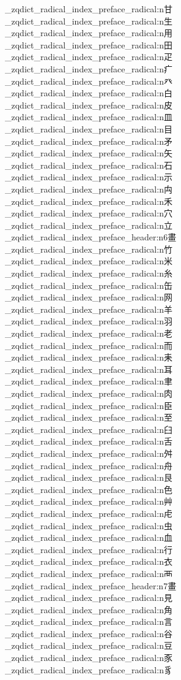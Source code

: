 {\begin{multicols}{5}
  \_zqdict_radical_index_preface_radical:n{甘}
  \_zqdict_radical_index_preface_radical:n{生}
  \_zqdict_radical_index_preface_radical:n{用}
  \_zqdict_radical_index_preface_radical:n{田}
  \_zqdict_radical_index_preface_radical:n{疋}
  \_zqdict_radical_index_preface_radical:n{疒}
  \_zqdict_radical_index_preface_radical:n{癶}
  \_zqdict_radical_index_preface_radical:n{白}
  \_zqdict_radical_index_preface_radical:n{皮}
  \_zqdict_radical_index_preface_radical:n{皿}
  \_zqdict_radical_index_preface_radical:n{目}
  \_zqdict_radical_index_preface_radical:n{矛}
  \_zqdict_radical_index_preface_radical:n{矢}
  \_zqdict_radical_index_preface_radical:n{石}
  \_zqdict_radical_index_preface_radical:n{示}
  \_zqdict_radical_index_preface_radical:n{禸}
  \_zqdict_radical_index_preface_radical:n{禾}
  \_zqdict_radical_index_preface_radical:n{穴}
  \_zqdict_radical_index_preface_radical:n{立}
  \_zqdict_radical_index_preface_header:n{6畫}
  \_zqdict_radical_index_preface_radical:n{竹}
  \_zqdict_radical_index_preface_radical:n{米}
  \_zqdict_radical_index_preface_radical:n{糸}
  \_zqdict_radical_index_preface_radical:n{缶}
  \_zqdict_radical_index_preface_radical:n{网}
  \_zqdict_radical_index_preface_radical:n{羊}
  \_zqdict_radical_index_preface_radical:n{羽}
  \_zqdict_radical_index_preface_radical:n{老}
  \_zqdict_radical_index_preface_radical:n{而}
  \_zqdict_radical_index_preface_radical:n{耒}
  \_zqdict_radical_index_preface_radical:n{耳}
  \_zqdict_radical_index_preface_radical:n{聿}
  \_zqdict_radical_index_preface_radical:n{肉}
  \_zqdict_radical_index_preface_radical:n{臣}
  \_zqdict_radical_index_preface_radical:n{至}
  \_zqdict_radical_index_preface_radical:n{臼}
  \_zqdict_radical_index_preface_radical:n{舌}
  \_zqdict_radical_index_preface_radical:n{舛}
  \_zqdict_radical_index_preface_radical:n{舟}
  \_zqdict_radical_index_preface_radical:n{艮}
  \_zqdict_radical_index_preface_radical:n{色}
  \_zqdict_radical_index_preface_radical:n{艸}
  \_zqdict_radical_index_preface_radical:n{虍}
  \_zqdict_radical_index_preface_radical:n{虫}
  \_zqdict_radical_index_preface_radical:n{血}
  \_zqdict_radical_index_preface_radical:n{行}
  \_zqdict_radical_index_preface_radical:n{衣}
  \_zqdict_radical_index_preface_radical:n{襾}
  \_zqdict_radical_index_preface_header:n{7畫}
  \_zqdict_radical_index_preface_radical:n{見}
  \_zqdict_radical_index_preface_radical:n{角}
  \_zqdict_radical_index_preface_radical:n{言}
  \_zqdict_radical_index_preface_radical:n{谷}
  \_zqdict_radical_index_preface_radical:n{豆}
  \_zqdict_radical_index_preface_radical:n{豕}
  \_zqdict_radical_index_preface_radical:n{豸}

\end{multicols}}
